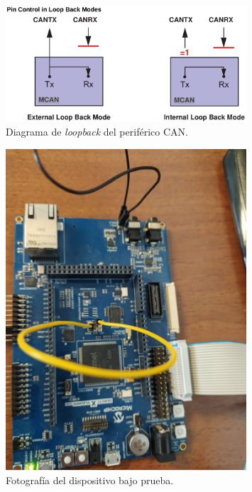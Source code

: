\begin{figure}[htbp]
	\centering
	\includegraphics[width=0.8\textwidth]{./Figures/canloopback.png}
    \caption{Diagrama de \emph{loopback} del periférico CAN\citep{ARTICLE:dutdatasheet}.}
	\label{fig:canloopback}
\end{figure}

\begin{figure}[htbp]
	\centering
	\includegraphics[width=0.8\textwidth]{./Figures/labo.jpeg}
    \caption{Fotografía del dispositivo bajo prueba.}
	\label{fig:labo}
\end{figure}

